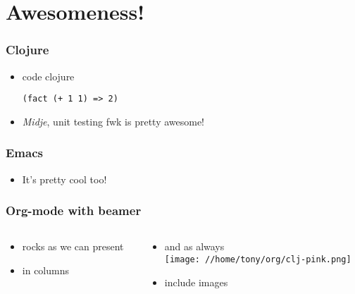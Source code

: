 \documentclass[bigger]{beamer}
\begin{document}
\section{Awesomeness!}
\label{sec-2}
\begin{frame}[fragile]
\frametitle{Clojure}
\label{sec-2-1}
\begin{itemize}

\item code clojure\\
\label{sec-2-1-1}%
\begin{verbatim}
(fact (+ 1 1) => 2)
\end{verbatim}

\item \emph{Midje}, unit testing fwk is pretty awesome!
\label{sec-2-1-2}%
\end{itemize} %
\end{frame}
\begin{frame}
\frametitle{Emacs}
\label{sec-2-2}
\begin{itemize}

\item It's pretty cool too!
\label{sec-2-2-1}%
\end{itemize} %
\end{frame}
\begin{frame}
\frametitle{Org-mode with beamer}
\label{sec-2-3}
\begin{columns}
\begin{column}{0.5\textwidth}
\begin{itemize}

\item rocks as we can present
\label{sec-2-3-1}%

\item in columns
\label{sec-2-3-2}%
\end{itemize} %
\end{column}
\begin{column}{0.5\textwidth}
\begin{itemize}

\item and as always\\
\label{sec-2-3-3}%
\texttt{[image: //home/tony/org/clj-pink.png]}

\item include images
\label{sec-2-3-4}%
\end{itemize} %
\end{column}
\end{columns}
\end{frame}
\end{document}
